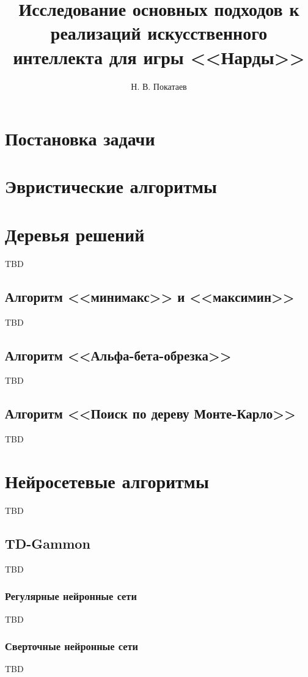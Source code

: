 \documentclass{ammstudconf}
\title{Исследование основных подходов к реализаций искусственного интеллекта для игры <<Нарды>>}
\author{Н. В. Покатаев}
\begin{document}
\maketitle



\section{Постановка задачи}


\section{Эвристические алгоритмы}


\section{Деревья решений}
TBD

\subsection{Алгоритм <<минимакс>> и <<максимин>>}
TBD

\subsection{Алгоритм <<Альфа-бета-обрезка>>}
TBD

\subsection{Алгоритм <<Поиск по дереву Монте-Карло>>}
TBD

\section{Нейросетевые алгоритмы}
TBD

\subsection{TD-Gammon}
TBD

\subsubsection{Регулярные нейронные сети}
TBD

\subsubsection{Сверточные нейронные сети}
TBD
\end{document}

